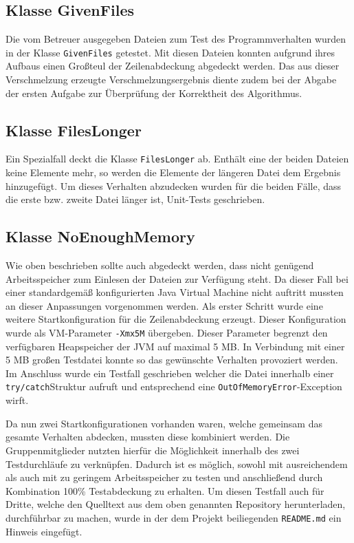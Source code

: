 \documentclass[a4paper,titlepage,12pt]{scrartcl}
\begin{document}
\subsection{Klasse GivenFiles}
\label{sec:givenfiles}
Die vom Betreuer ausgegeben Dateien zum Test des Programmverhalten wurden in der Klasse \texttt{GivenFiles} getestet. Mit diesen Dateien konnten aufgrund ihres Aufbaus einen Großteul der Zeilenabdeckung abgedeckt werden. Das aus dieser Verschmelzung erzeugte Verschmelzungsergebnis diente zudem bei der Abgabe der ersten Aufgabe zur Überprüfung der Korrektheit des Algorithmus.

\subsection{Klasse FilesLonger}
\label{sec:fileslonger}
Ein Spezialfall deckt die Klasse \texttt{FilesLonger} ab. Enthält eine der beiden Dateien keine Elemente mehr, so werden die Elemente der längeren Datei dem Ergebnis hinzugefügt.
Um dieses Verhalten abzudecken wurden für die beiden Fälle, dass die erste bzw. zweite Datei länger ist, Unit-Tests geschrieben.

\subsection{Klasse NoEnoughMemory}
\label{sec:notenoughmemory}
Wie oben beschrieben sollte auch abgedeckt werden, dass nicht genügend Arbeitsspeicher zum Einlesen der Dateien zur Verfügung steht.
Da dieser Fall bei einer standardgemäß konfigurierten Java Virtual Machine nicht auftritt mussten an dieser Anpassungen vorgenommen werden.
Als erster Schritt wurde eine weitere Startkonfiguration für die Zeilenabdeckung erzeugt. Dieser Konfiguration wurde als VM-Parameter \texttt{-Xmx5M} übergeben.
Dieser Parameter begrenzt den verfügbaren Heapspeicher der JVM auf maximal 5 MB. In Verbindung mit einer 5 MB großen Testdatei konnte so das gewünschte Verhalten provoziert werden.
Im Anschluss wurde ein Testfall geschrieben welcher die Datei innerhalb einer \texttt{try/catch}\-Struktur aufruft und entsprechend eine \texttt{OutOfMemoryError}-Exception wirft.

Da nun zwei Startkonfigurationen vorhanden waren, welche gemeinsam das gesamte Verhalten abdecken, mussten diese kombiniert werden.
Die Gruppenmitglieder nutzten hierfür die Möglichkeit innerhalb des \citep{www:ECLEMMA} zwei Testdurchläufe zu verknüpfen.
Dadurch ist es möglich, sowohl mit ausreichendem als auch mit zu geringem Arbeitsspeicher zu testen und anschließend durch Kombination 100\% Testabdeckung zu erhalten.
Um diesen Testfall auch für Dritte, welche den Quelltext aus dem oben genannten Repository herunterladen, durchführbar zu machen, wurde in der dem Projekt beiliegenden \texttt{README.md} ein Hinweis eingefügt.

\clearpage
\appendix



\end{document}
